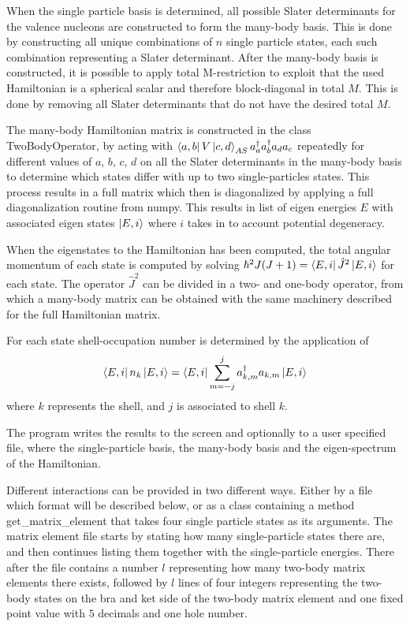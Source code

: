 When the single particle basis is determined, all possible Slater determinants for the valence nucleons are constructed to form the many-body basis.
This is done by constructing all unique combinations of \(n\) single particle states, each such combination representing a Slater determinant.
After the many-body basis is constructed, it is possible to apply total M-restriction to exploit that the used Hamiltonian is a spherical scalar and therefore block-diagonal in total \(M\). This is done by removing all Slater determinants that do not have the desired total \(M\).

The many-body Hamiltonian matrix is constructed in the class TwoBodyOperator, by acting with \(\bra{a,b}V\ket{c,d}_{AS}a^\dagger_a a^\dagger_b a_d a_c\) repeatedly for different values of \(a,\,b,\,c,\,d\) on all the Slater determinants in the many-body basis to determine which states differ with up to two single-particles states. This process results in a full matrix
which then is diagonalized by applying a full diagonalization routine from numpy. %
This results in list of eigen energies \(E\) with associated eigen states \(\ket{E,i}\) where \(i\) takes in to account potential degeneracy.

When the eigenstates to the Hamiltonian has been computed, the total angular momentum of each state is computed by solving  \(\hbar^2 J(J+1) = \bra{E,i}\hat{J}^2\ket{E,i}\) for each state. The operator \(\hat{J}^2\) can be divided in a two- and one-body operator, from which a many-body matrix can be obtained with the same machinery described for the full Hamiltonian matrix.

For each state shell-occupation number is determined by the application of
\begin{equation}
  \bra{E,i}n_k\ket{E,i}=\bra{E,i}\sum_{m=-j}^j a^\dagger_{k,m}a_{k,m}\ket{E,i}
\end{equation}
where \(k\) represents the shell, and \(j\) is associated to shell \(k\).

The program writes the results to the screen and optionally to a user specified file, where the single-particle basis, the many-body basis and the eigen-spectrum of the Hamiltonian.

Different interactions can be provided in two different ways. Either by a file which format will be described below, or as a class containing a method get\_matrix\_element that takes four single particle states as its arguments.
The matrix element file starts by stating how many single-particle states there are, and then continues listing them together with the single-particle energies. There after the file contains a number \(l\) representing how many two-body matrix elements there exists, followed by \(l\) lines of four integers representing the two-body states on the bra and ket side of the two-body matrix element and one fixed point value with \(5\) decimals and one hole number.
